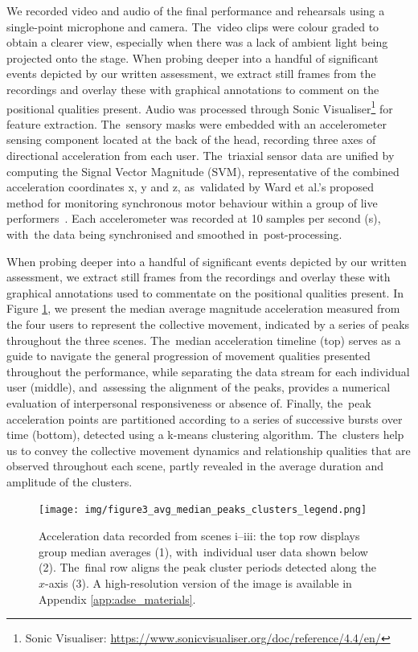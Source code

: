 We recorded video and audio of the final performance and rehearsals using a single-point microphone and camera. The~video clips were colour graded to obtain a clearer view, especially when there was a lack of ambient light being projected onto the stage. When probing deeper into a handful of significant events depicted by our written assessment, we extract still frames from the recordings and overlay these with graphical annotations to comment on the positional qualities present. Audio was processed through Sonic Visualiser\footnote{Sonic Visualiser: \url{https://www.sonicvisualiser.org/doc/reference/4.4/en/}} for feature extraction. The~sensory masks were embedded with an accelerometer sensing component located at the back of the head, recording three axes of directional acceleration from each user. The~triaxial sensor data are unified by computing the Signal Vector Magnitude (SVM), representative of the combined acceleration coordinates x, y and z, as~validated by Ward et al.'s %
proposed method for monitoring synchronous motor behaviour within a group of live performers~\cite{ward_sensing_2018}. Each accelerometer was recorded at 10 samples per second (s), with~the data being synchronised and smoothed in~post-processing.

When probing deeper into a handful of significant events depicted by our written assessment, we extract still frames from the recordings and overlay these with graphical annotations used to commentate on the positional qualities present. In Figure \ref{fig:sensor_data}, we present the median average magnitude acceleration measured from the four users to represent the collective movement, indicated by a series of peaks throughout the three scenes. The~median acceleration timeline (top) serves as a guide to navigate the general progression of movement qualities presented throughout the performance, while separating the data stream for each individual user (middle), and~assessing the alignment of the peaks, provides a numerical evaluation of interpersonal responsiveness or absence of. Finally, the~peak acceleration points are partitioned according to a series of successive bursts over time (bottom), detected using a k-means clustering algorithm. The~clusters help us to convey the collective movement dynamics and relationship qualities that are observed throughout each scene, partly revealed in the average duration and amplitude of the clusters.

\begin{figure}[H]
\texttt{[image: img/figure3\_avg\_median\_peaks\_clusters\_legend.png]}
\caption{Acceleration data recorded from scenes
 i--iii: the top row displays group median averages (1), with~individual user data shown below (2). The~final row aligns the peak cluster periods detected along the $x$-axis (3).
A high-resolution version of the image is available in Appendix \ref{app:adse_materials}.}\label{fig:sensor_data}
\end{figure}

